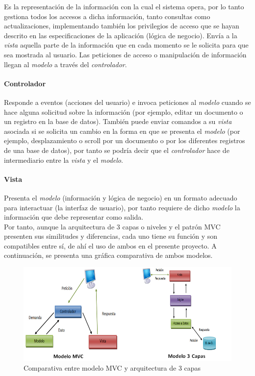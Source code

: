 Es la representación de la información con la cual el sistema opera, por lo tanto gestiona todos los accesos a dicha información, tanto consultas como actualizaciones, implementando también los privilegios de acceso que se hayan descrito en las especificaciones de la aplicación (lógica de negocio). Envía a la \textit{vista} aquella parte de la información que en cada momento se le solicita para que sea mostrada al usuario. Las peticiones de acceso o manipulación de información llegan al \textit{modelo} a través del \textit{controlador}.

\paragraph*{Controlador}

Responde a eventos (acciones del usuario) e invoca peticiones al \textit{modelo} cuando se hace alguna solicitud sobre la información (por ejemplo, editar un documento o un registro en la base de datos). También puede enviar comandos a su \textit{vista} asociada si se solicita un cambio en la forma en que se presenta el \textit{modelo} (por ejemplo, desplazamiento o scroll por un documento o por los diferentes registros de una base de datos), por tanto se podría decir que el \textit{controlador} hace de intermediario entre la \textit{vista}  y el \textit{modelo}.

\paragraph*{Vista}

Presenta el \textit{modelo} (información y lógica de negocio) en un formato adecuado para interactuar (la interfaz de usuario), por tanto requiere de dicho \textit{modelo} la información que debe representar como salida.\\

Por tanto, aunque la arquitectura de 3 capas o niveles y el patrón MVC presenten sus similitudes y diferencias, cada uno tiene su función y son compatibles entre sí, de ahí el uso de ambos en el presente proyecto. A continuación, se presenta una gráfica comparativa de ambos modelos. 

\vspace{10mm}

\begin{figure}[H]
\centering
  \includegraphics[scale=.50]{img/MVC-vs-3-capas.jpg}
  \caption{Comparativa entre modelo MVC y arquitectura de 3 capas}
  \label{fig:MVC-vs-3-capas}
\end{figure}

